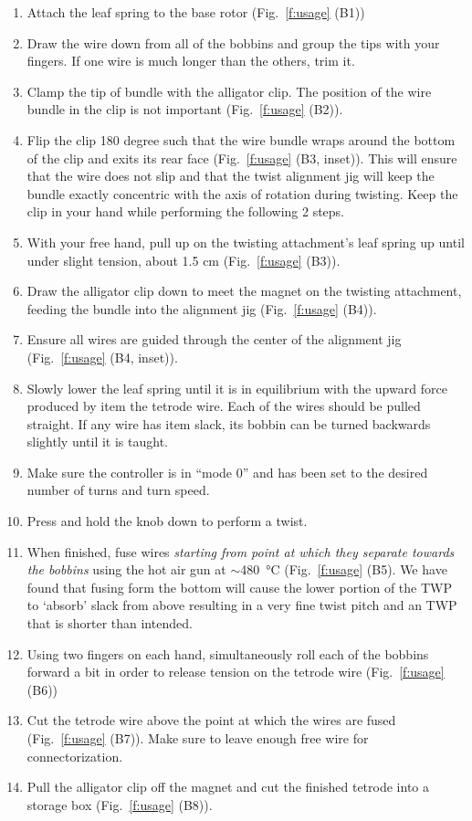 \documentclass[11pt,a4paper]{article}
\begin{document}
\begin{enumerate}[noitemsep]
    \item Attach the leaf spring to the base rotor (Fig.~\ref{f:usage} (B1))
    \item Draw the wire down from all of the bobbins and group the tips with
        your fingers. If one wire is much longer than the others, trim it.
    \item Clamp the tip of bundle with the alligator clip. The position of the
        wire bundle in the clip is not important (Fig.~\ref{f:usage} (B2)).
    \item Flip the clip 180 degree such that the wire bundle wraps around the
        bottom of the clip and exits its rear face (Fig.~\ref{f:usage} (B3, inset)). This will ensure that the
        wire does not slip and that the twist alignment jig will keep the
        bundle exactly concentric with the axis of rotation during twisting.
        Keep the clip in your hand while performing the following 2 steps.
    \item With your free hand, pull up on the twisting attachment's leaf spring
        up until under slight tension, about 1.5 cm (Fig.~\ref{f:usage} (B3)).
    \item Draw the alligator clip down to meet the magnet on the twisting
        attachment, feeding the bundle into the alignment jig (Fig.~\ref{f:usage} (B4)).
    \item Ensure all wires are guided through the center of the alignment jig
        (Fig.~\ref{f:usage} (B4, inset)).
    \item Slowly lower the leaf spring until it is in equilibrium with the
        upward force produced by item the tetrode wire. Each of the wires
        should be pulled straight. If any wire has item slack, its bobbin can
        be turned backwards slightly until it is taught.
    \item Make sure the controller is in ``mode 0'' and has been set to the
        desired number of turns and turn speed.
    \item Press and hold the knob down to perform a twist.
    \item When finished, fuse wires \textit{starting from point at which they
        separate towards the bobbins} using the hot air gun at
        $\sim$\SI{480}{\celsius} (Fig.~\ref{f:usage} (B5). We have found that
        fusing form the bottom will cause the lower portion of the TWP to
        `absorb' slack from above resulting in a very fine twist pitch and an
        TWP that is shorter than intended.
    \item Using two fingers on each hand, simultaneously roll each of the
        bobbins forward a bit in order to release tension on the tetrode wire
        (Fig.~\ref{f:usage} (B6))
    \item Cut the tetrode wire above the point at which the wires are fused
        (Fig.~\ref{f:usage} (B7)). Make sure to leave enough free wire for
        connectorization.
    \item Pull the alligator clip off the magnet and cut the finished tetrode
        into a storage box (Fig.~\ref{f:usage} (B8)).
\end{enumerate}
\end{document}
